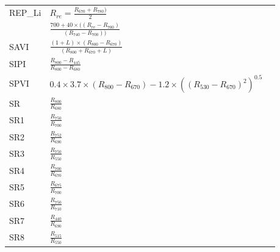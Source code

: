 \documentclass[remotesensing,article,submit,moreauthors,pdftex]{Definitions/mdpi}
\begin{document}
{\begin{supertabular}{lll}
		\midrule
		REP\_Li         & $R_{re}=\frac{R_{670}+R_{780})}{2}$                                                                  & \cite{guyot1988}              \\
		& $\frac{700 + 40 \times ((R_{re} -R_{700})}{(R_{740}-R_{700}))}$                                      &                               \\
		\midrule
		SAVI            & $\frac{(1+L)\times (R_{800}-R_{670})}{(R_{800}+R_{670}+L)}$                                          & \cite{huete1988}              \\
		SIPI            & $\frac{R_{800}-R_{445}}{R_{800}-R_{680}}$                                                            & \cite{penuelasj.1995}         \\
		\midrule
		SPVI            & \parbox{3.8cm}{$0.4 \times 3.7 \times (R_{800}-R_{670})-1.2 \times ((R_{530}-R_{670})^2)^{0.5}$}     & \cite{vincini2006}            \\
		\midrule
		SR              & $\frac{R_{800}}{R_{680}}$                                                                            & \cite{jordan1969}             \\
		SR1             & $\frac{R_{750}}{R_{700}}$                                                                            & \cite{gitelson1997}           \\
		SR2             & $\frac{R_{752}}{R_{690}}$                                                                            & \cite{gitelson1997}           \\
		SR3             & $\frac{R_{750}}{R_{550}}$                                                                            & \cite{gitelson1997}           \\
		SR4             & $\frac{R_{700}}{R_{670}}$                                                                            & \cite{mcmurtrey1994}          \\
		SR5             & $\frac{R_{675}}{R_{700}}$                                                                            & \cite{chappelle1992}          \\
		SR6             & $\frac{R_{750}}{R_{710}}$                                                                            & \cite{zarco-tejada1999}       \\
		SR7             & $\frac{R_{440}}{R_{690}}$                                                                            & \cite{lichtenthaler1996}      \\
		SR8             & $\frac{R_{515}}{R_{550}}$                                                                            & \cite{hernandez-clemente2012} \\

\end{supertabular}}
\end{document}
